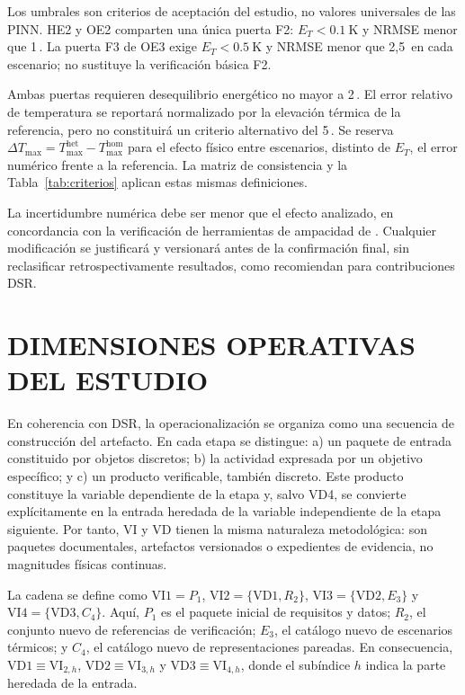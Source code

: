 Los umbrales son criterios de aceptación del estudio, no valores universales de las PINN. HE2 y OE2 comparten una única puerta F2: $E_T<\SI{0.1}{\kelvin}$ y NRMSE menor que 1\,\pct{}. La puerta F3 de OE3 exige $E_T<\SI{0.5}{\kelvin}$ y NRMSE menor que 2,5\,\pct{} en cada escenario; no sustituye la verificación básica F2.

Ambas puertas requieren desequilibrio energético no mayor a 2\,\pct{}. El error relativo de temperatura se reportará normalizado por la elevación térmica de la referencia, pero no constituirá un criterio alternativo del 5\,\pct{}. Se reserva $\Delta T_{\max}=T_{\max}^{\mathrm{het}}-T_{\max}^{\mathrm{hom}}$ para el efecto físico entre escenarios, distinto de $E_T$, el error numérico frente a la referencia. La matriz de consistencia y la Tabla~\ref{tab:criterios} aplican estas mismas definiciones.

La incertidumbre numérica debe ser menor que el efecto analizado, en concordancia con la verificación de herramientas de ampacidad de \textcite[93--99]{cigre2025}. Cualquier modificación se justificará y versionará antes de la confirmación final, sin reclasificar retrospectivamente resultados, como recomiendan \textcite[350--351]{gregor2013} para contribuciones DSR.

\section{DIMENSIONES OPERATIVAS DEL ESTUDIO}
\label{sec:dimensiones-operativas}

En coherencia con DSR, la operacionalización se organiza como una secuencia de construcción del artefacto. En cada etapa se distingue: a) un paquete de entrada constituido por objetos discretos; b) la actividad expresada por un objetivo específico; y c) un producto verificable, también discreto. Este producto constituye la variable dependiente de la etapa y, salvo VD4, se convierte explícitamente en la entrada heredada de la variable independiente de la etapa siguiente. Por tanto, VI y VD tienen la misma naturaleza metodológica: son paquetes documentales, artefactos versionados o expedientes de evidencia, no magnitudes físicas continuas.

La cadena se define como $\mathrm{VI1}=P_1$, $\mathrm{VI2}=\{\mathrm{VD1},R_2\}$, $\mathrm{VI3}=\{\mathrm{VD2},E_3\}$ y $\mathrm{VI4}=\{\mathrm{VD3},C_4\}$. Aquí, $P_1$ es el paquete inicial de requisitos y datos; $R_2$, el conjunto nuevo de referencias de verificación; $E_3$, el catálogo nuevo de escenarios térmicos; y $C_4$, el catálogo nuevo de representaciones pareadas. En consecuencia, $\mathrm{VD1}\equiv\mathrm{VI}_{2,h}$, $\mathrm{VD2}\equiv\mathrm{VI}_{3,h}$ y $\mathrm{VD3}\equiv\mathrm{VI}_{4,h}$, donde el subíndice $h$ indica la parte heredada de la entrada.


